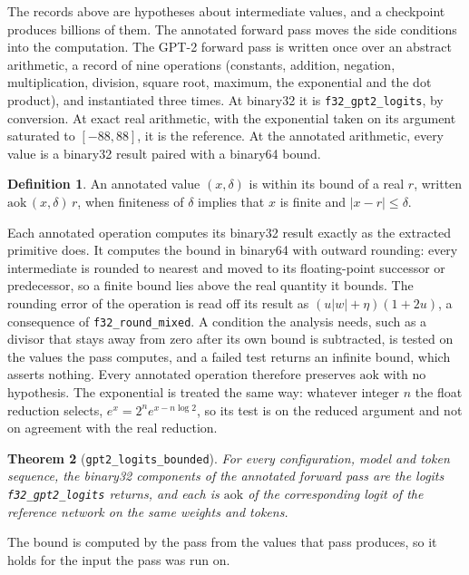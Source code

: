 \documentclass[11pt]{article}
\theoremstyle{plain}
\newtheorem{theorem}{Theorem}[section]
\theoremstyle{definition}
\newtheorem{definition}[theorem]{Definition}
\newcommand{\code}[1]{\texttt{#1}}
\begin{document}
The records above are hypotheses about intermediate values, and a checkpoint
produces billions of them. The annotated forward pass moves the side conditions
into the computation. The GPT-2 forward pass is written once over an abstract
arithmetic, a record of nine operations (constants, addition, negation,
multiplication, division, square root, maximum, the exponential and the dot
product), and instantiated three times. At binary32 it is
\code{f32\_gpt2\_logits}, by conversion. At exact real arithmetic, with the
exponential taken on its argument saturated to $[-88, 88]$, it is the
reference. At the annotated arithmetic, every value is a binary32 result paired
with a binary64 bound.

\begin{definition}
An annotated value $(x, \delta)$ is within its bound of a real $r$, written
$\mathrm{aok}\,(x,\delta)\,r$, when finiteness of $\delta$ implies that $x$ is
finite and $|x - r| \le \delta$.
\end{definition}

Each annotated operation computes its binary32 result exactly as the extracted
primitive does. It computes the bound in binary64 with outward rounding: every
intermediate is rounded to nearest and moved to its floating-point successor or
predecessor, so a finite bound lies above the real quantity it bounds. The
rounding error of the operation is read off its result as
$(u|w| + \eta)(1 + 2u)$, a consequence of \code{f32\_round\_mixed}. A condition
the analysis needs, such as a divisor that stays away from zero after its own
bound is subtracted, is tested on the values the pass computes, and a failed
test returns an infinite bound, which asserts nothing. Every annotated operation
therefore preserves $\mathrm{aok}$ with no hypothesis. The exponential is
treated the same way: whatever integer $n$ the float reduction selects,
$e^{x} = 2^{n} e^{x - n\log 2}$, so its test is on the reduced argument and not
on agreement with the real reduction.

\begin{theorem}[\code{gpt2\_logits\_bounded}]
For every configuration, model and token sequence, the binary32 components of
the annotated forward pass are the logits \code{f32\_gpt2\_logits} returns, and
each is $\mathrm{aok}$ of the corresponding logit of the reference network on
the same weights and tokens.
\end{theorem}

The bound is computed by the pass from the values that pass produces, so it
holds for the input the pass was run on.
\end{document}
